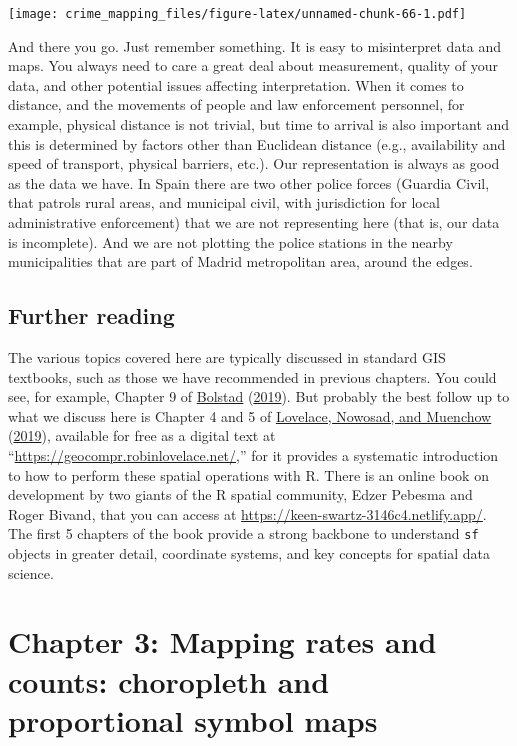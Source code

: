 \documentclass[
]{book}
\begin{document}
\texttt{[image: crime\_mapping\_files/figure-latex/unnamed-chunk-66-1.pdf]}

And there you go. Just remember something. It is easy to misinterpret data and maps. You always need to care a great deal about measurement, quality of your data, and other potential issues affecting interpretation. When it comes to distance, and the movements of people and law enforcement personnel, for example, physical distance is not trivial, but time to arrival is also important and this is determined by factors other than Euclidean distance (e.g., availability and speed of transport, physical barriers, etc.). Our representation is always as good as the data we have. In Spain there are two other police forces (Guardia Civil, that patrols rural areas, and municipal civil, with jurisdiction for local administrative enforcement) that we are not representing here (that is, our data is incomplete). And we are not plotting the police stations in the nearby municipalities that are part of Madrid metropolitan area, around the edges.

\hypertarget{further-reading-1}{%
\section{Further reading}\label{further-reading-1}}

The various topics covered here are typically discussed in standard GIS textbooks, such as those we have recommended in previous chapters. You could see, for example, Chapter 9 of \protect\hyperlink{ref-Bolstad_2019}{Bolstad} (\protect\hyperlink{ref-Bolstad_2019}{2019}). But probably the best follow up to what we discuss here is Chapter 4 and 5 of \protect\hyperlink{ref-Lovelace_2019}{Lovelace, Nowosad, and Muenchow} (\protect\hyperlink{ref-Lovelace_2019}{2019}), available for free as a digital text at ``\url{https://geocompr.robinlovelace.net/},'' for it provides a systematic introduction to how to perform these spatial operations with R. There is an online book on development by two giants of the R spatial community, Edzer Pebesma and Roger Bivand, that you can access at \url{https://keen-swartz-3146c4.netlify.app/}. The first 5 chapters of the book provide a strong backbone to understand \texttt{sf} objects in greater detail, coordinate systems, and key concepts for spatial data science.

\hypertarget{chapter-3-mapping-rates-and-counts-choropleth-and-proportional-symbol-maps}{%
\chapter{Chapter 3: Mapping rates and counts: choropleth and proportional symbol maps}\label{chapter-3-mapping-rates-and-counts-choropleth-and-proportional-symbol-maps}}
\end{document}
